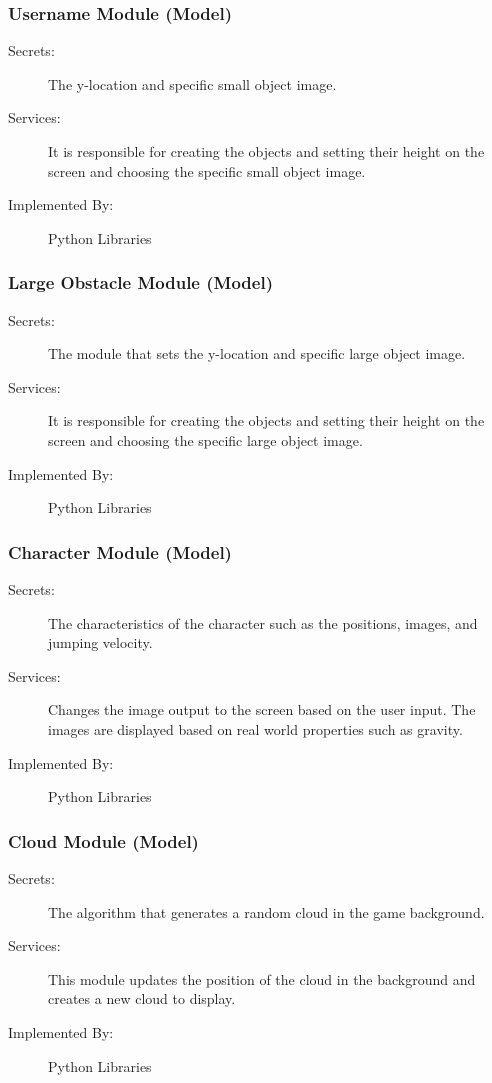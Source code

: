 \documentclass[12pt, titlepage]{article}
\begin{document}
\subsubsection{Username Module (Model)}
\begin{description}
\item[Secrets:] The y-location and specific small object image. 
\item[Services:] It is responsible for creating the objects and setting their height on the screen and choosing the specific small object image.
\item[Implemented By:] Python Libraries
\end{description}


\subsubsection{Large Obstacle Module (Model)}
\begin{description}
\item[Secrets:] The module that sets the y-location and specific large object image. 
\item[Services:] It is responsible for creating the objects and setting their height on the screen and choosing the specific large object image. 
\item[Implemented By:] Python Libraries
\end{description}


\subsubsection{Character Module (Model)}
\begin{description}
\item[Secrets:] The characteristics of the character such as the positions, images, and jumping velocity. 
\item[Services:] Changes the image output to the screen based on the user input. The images are displayed based on real world properties such as gravity. 
\item[Implemented By:] Python Libraries
\end{description}


\subsubsection{Cloud Module (Model)}
\begin{description}
\item[Secrets:] The algorithm that generates a random cloud in the game background.
\item[Services:] This module updates the position of the cloud in the background and creates a new cloud to display. 
\item[Implemented By:] Python Libraries
\end{description}
\end{document}
